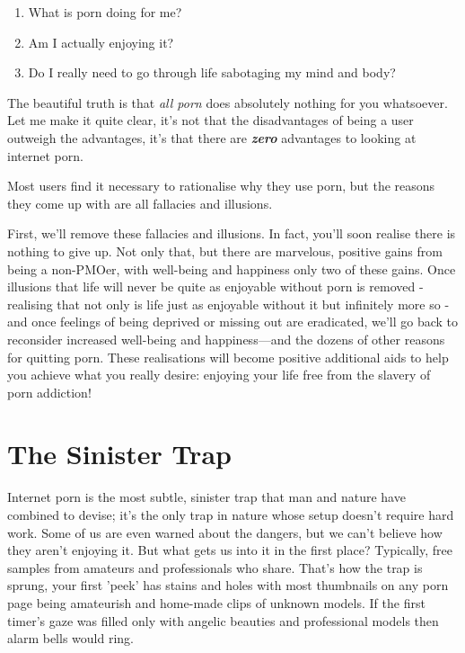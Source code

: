 \documentclass[
]{book}
\begin{document}
\begin{enumerate}
\def\labelenumi{\arabic{enumi}.}
\item
  What is porn doing for me?
\item
  Am I actually enjoying it?
\item
  Do I really need to go through life sabotaging my mind and body?
\end{enumerate}

The beautiful truth is that \emph{all porn} does absolutely nothing for you whatsoever. Let me make it quite clear, it's not that the disadvantages of being a user outweigh the advantages, it's that there are \textbf{\emph{zero}} advantages to looking at internet porn.

Most users find it necessary to rationalise why they use porn, but the reasons they come up with are all fallacies and illusions.

First, we'll remove these fallacies and illusions. In fact, you'll soon realise there is nothing to give up. Not only that, but there are marvelous, positive gains from being a non-PMOer, with well-being and happiness only two of these gains. Once illusions that life will never be quite as enjoyable without porn is removed - realising that not only is life just as enjoyable without it but infinitely more so - and once feelings of being deprived or missing out are eradicated, we'll go back to reconsider increased well-being and happiness---and the dozens of other reasons for quitting porn. These realisations will become positive additional aids to help you achieve what you really desire: enjoying your life free from the slavery of porn addiction!

\hypertarget{the-sinister-trap}{%
\section{The Sinister Trap}\label{the-sinister-trap}}

Internet porn is the most subtle, sinister trap that man and nature have combined to devise; it's the only trap in nature whose setup doesn't require hard work. Some of us are even warned about the dangers, but we can't believe how they aren't enjoying it. But what gets us into it in the first place? Typically, free samples from amateurs and professionals who share. That's how the trap is sprung, your first 'peek' has stains and holes with most thumbnails on any porn page being amateurish and home-made clips of unknown models. If the first timer's gaze was filled only with angelic beauties and professional models then alarm bells would ring.
\end{document}
